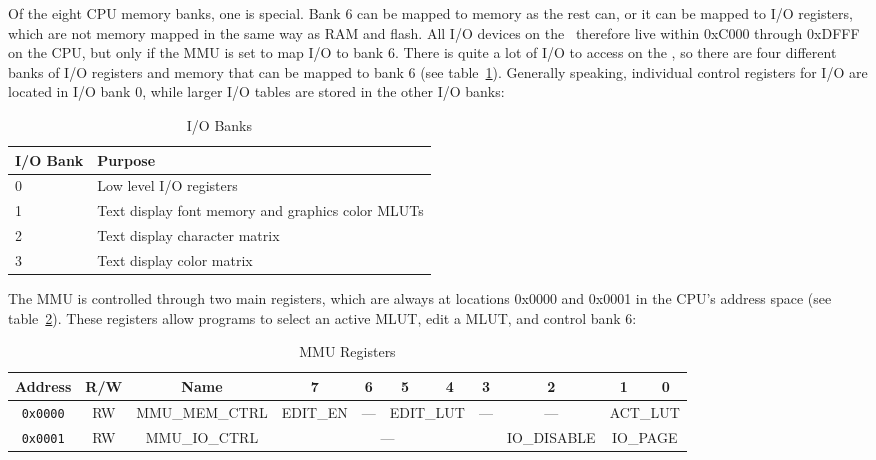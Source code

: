 Of the eight CPU memory banks, one is special. Bank 6 can be mapped to memory as the rest can, or it can be mapped to I/O registers, which are not memory mapped in the same way as RAM and flash. All I/O devices on the \jr\ therefore live within 0xC000 through 0xDFFF on the CPU, but only if the MMU is set to map I/O to bank 6. There is quite a lot of I/O to access on the \jr, so there are four different banks of I/O registers and memory that can be mapped to bank 6 (see table~\ref{tab:io_banks}). Generally speaking, individual control registers for I/O are located in I/O bank 0, while larger I/O tables are stored in the other I/O banks:

\begin{table}[ht]
	\begin{center}
		\begin{tabular}{| l | l |} \hline
			I/O Bank & Purpose \\ \hline\hline
			0 & Low level I/O registers \\ \hline
			1 & Text display font memory and graphics color MLUTs \\ \hline
			2 & Text display character matrix \\ \hline
			3 & Text display color matrix \\ \hline
		\end{tabular}
	\end{center}
	\caption{I/O Banks}
	\label{tab:io_banks}
\end{table}

The MMU is controlled through two main registers, which are always at locations 0x0000 and 0x0001 in the CPU's address space (see table~\ref{tab:mmu_registers}). These registers allow programs to select an active MLUT, edit a MLUT, and control bank 6:

\begin{table}[ht]
	\begin{center}
		\begin{tabular}{| c | c | c || c | c | c | c | c | c | c | c |} \hline
			Address & R/W & Name & 7 & 6 & 5 & 4 & 3 & 2 & 1 & 0 \\ \hline\hline
			\verb+0x0000+ & RW & MMU\_MEM\_CTRL & EDIT\_EN & --- & \multicolumn{2}{|c|}{EDIT\_LUT} & --- & --- & \multicolumn{2}{|c|}{ACT\_LUT} \\ \hline
			\verb+0x0001+ & RW & MMU\_IO\_CTRL & \multicolumn{5}{|c|}{---} & IO\_DISABLE & \multicolumn{2}{|c|}{IO\_PAGE} \\ \hline
		\end{tabular}
	\end{center}
	\caption{MMU Registers}
	\label{tab:mmu_registers}
\end{table}

